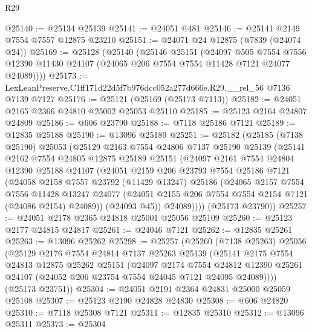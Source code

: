 \begin{lexlean}{R29}
\begin{coremodule}
@25140 := @25134 @25139
@25141 := @24051 @481
@25146 := @25141 @2149 @7554 @7557 @12875 @23210
@25151 := @24071 @24 @12875 (@7839 (@24074 @24))
@25169 := @25128
    (@25140
      (@25146
        @25151
        (@24097
          @505
          @7554
          @7556
          @12390
          @11430
          @24107
          (@24065 @206 @7554 @7554 @11428 @7121 @24077 @24089))))
@25173 := LexLeanPreserve.C1ff171d22d5f7b976dcc052a277d666e.R29.__rel_56 @7136 @7139 @7127
@25176 := @25121 (@25169 (@25173 @7113))
@25182 := @24051 @2165 @2366 @24810 @25002 @25053 @25110
@25185 := @25123 @2164 @24807 @24809
@25186 := @606 @23790
@25188 := @7118 @25186 @7121
@25189 := @12835 @25188
@25190 := @13096 @25189
@25251 := @25182
    (@25185
      (@7138 @25190)
      @25053
      (@25129
        @2163
        @7554
        @24806
        @7137
        @25190
        @25139
        (@25141
          @2162
          @7554
          @24805
          @12875
          @25189
          @25151
          (@24097
            @2161
            @7554
            @24804
            @12390
            @25188
            @24107
            (@24051
              @2159
              @206
              @23793
              @7554
              @25186
              @7121
              (@24058
                @2158
                @7557
                @23792
                (@11429 @13247)
                @25186
                (@24065
                  @2157
                  @7554
                  @7556
                  @11428
                  @13247
                  @24077
                  (@24051 @2155 @206 @7554 @7554 @2154 @7121 (@24086 @2154) @24089))
                (@24093 @45))
              @24089))))
      (@25173 @23790))
@25257 := @24051 @2178 @2365 @24818 @25001 @25056 @25109
@25260 := @25123 @2177 @24815 @24817
@25261 := @24046 @7121
@25262 := @12835 @25261
@25263 := @13096 @25262
@25298 := @25257
    (@25260
      (@7138 @25263)
      @25056
      (@25129
        @2176
        @7554
        @24814
        @7137
        @25263
        @25139
        (@25141
          @2175
          @7554
          @24813
          @12875
          @25262
          @25151
          (@24097
            @2174
            @7554
            @24812
            @12390
            @25261
            @24107
            (@24052 @206 @23754 @7554 @24045 @7121 @24095 @24089))))
      (@25173 @23751))
@25304 := @24051 @2191 @2364 @24831 @25000 @25059 @25108
@25307 := @25123 @2190 @24828 @24830
@25308 := @606 @24820
@25310 := @7118 @25308 @7121
@25311 := @12835 @25310
@25312 := @13096 @25311
@25373 := @25304

\end{coremodule}
\end{lexlean}
